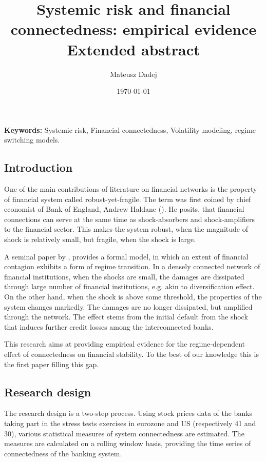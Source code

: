 \documentclass{article}
\title{Systemic risk and financial connectedness: empirical evidence \\
\textbf{Extended abstract}}
\author[1]{Mateusz Dadej}
\affil[1]{Univeristy of Brescia, Italy}
\date{\today}
\begin{document}
\maketitle

\textbf{Keywords:} Systemic risk, Financial connectedness, Volatility modeling, regime switching models.
\subsection*{Introduction}

One of the main contributions of literature on financial networks is the property of financial system called robust-yet-fragile. The term was first coined by chief economist of Bank of England, Andrew Haldane (\citet{haldane}). He posits, that financial connections can serve at the same time as shock-absorbers and shock-amplifiers to the financial sector. This makes the system robust, when the magnitude of shock is relatively small, but fragile, when the shock is large. 

A seminal paper by \citet{acemoglu}, provides a formal model, in which an extent of financial contagion exhibits a form of regime transition. In a densely connected network of financial institutions, when the shocks are small, the damages are dissipated through large number of financial institutions, e.g. akin to diversification effect. On the other hand, when the shock is above some threshold, the properties of the system changes markedly. The damages are no longer dissipated, but amplified through the network. The effect stems from the initial default from the shock that induces further credit losses among the interconnected banks. 

This research aims at providing empirical evidence for the regime-dependent effect of connectedness on financial stability. To the best of our knowledge this is the first paper filling this gap.

\subsection*{Research design}

The research design is a two-step process. Using stock prices data of the banks taking part in the stress tests exercises in eurozone and US (respectively 41 and 30), various statistical measures of system connectedness are estimated. The measures are calculated on a rolling window basis, providing the time series of connectedness of the banking system. 
\end{document}
